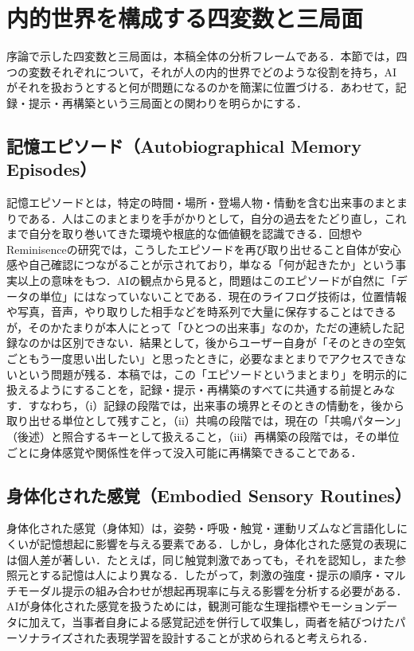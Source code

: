 \documentclass[originalpaper]{jsaiart}
\begin{document}
\section{内的世界を構成する四変数と三局面}\label{sec:framework}
序論で示した四変数と三局面は，本稿全体の分析フレームである．本節では，四つの変数それぞれについて，それが人の内的世界でどのような役割を持ち，AIがそれを扱おうとすると何が問題になるのかを簡潔に位置づける．あわせて，記録・提示・再構築という三局面との関わりを明らかにする．

\subsection{記憶エピソード（Autobiographical Memory Episodes）}
記憶エピソードとは，特定の時間・場所・登場人物・情動を含む出来事のまとまりである\cite{bartlett1932,conway2000}．人はこのまとまりを手がかりとして，自分の過去をたどり直し，これまで自分を取り巻いてきた環境や根底的な価値観を認識できる．回想やReminisenceの研究では，こうしたエピソードを再び取り出せること自体が安心感や自己確認につながることが示されており\cite{kontos2011}，単なる「何が起きたか」という事実以上の意味をもつ．AIの観点から見ると，問題はこのエピソードが自然に「データの単位」にはなっていないことである．現在のライフログ技術は，位置情報や写真，音声，やり取りした相手などを時系列で大量に保存することはできるが\cite{gemmell2002}，そのかたまりが本人にとって「ひとつの出来事」なのか，ただの連続した記録なのかは区別できない．結果として，後からユーザー自身が「そのときの空気ごともう一度思い出したい」と思ったときに，必要なまとまりでアクセスできないという問題が残る．本稿では，この「エピソードというまとまり」を明示的に扱えるようにすることを，記録・提示・再構築のすべてに共通する前提とみなす．すなわち，（i）記録の段階では，出来事の境界とそのときの情動を，後から取り出せる単位として残すこと，（ii）共鳴の段階では，現在の「共鳴パターン」（後述）と照合するキーとして扱えること，（iii）再構築の段階では，その単位ごとに身体感覚や関係性を伴って没入可能に再構築できることである．

\subsection{身体化された感覚（Embodied Sensory Routines）}
身体化された感覚（身体知\cite{suwa2017}）は，姿勢・呼吸・触覚・運動リズムなど言語化しにくいが記憶想起に影響を与える要素である\cite{casey2000,chaudhuri2014}．しかし，身体化された感覚の表現には個人差が著しい．たとえば，同じ触覚刺激であっても，それを認知し，また参照元とする記憶は人により異なる．したがって，刺激の強度・提示の順序・マルチモーダル提示の組み合わせが想起再現率に与える影響を分析する必要がある．AIが身体化された感覚を扱うためには，観測可能な生理指標やモーションデータに加えて，当事者自身による感覚記述を併行して収集し，両者を結びつけたパーソナライズされた表現学習を設計することが求められると考えられる．
\end{document}
